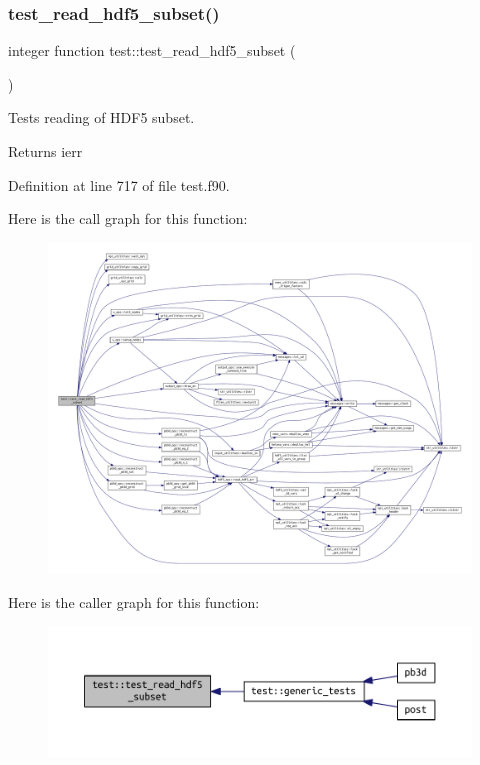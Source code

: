 \subsubsection{\texorpdfstring{test\+\_\+read\+\_\+hdf5\+\_\+subset()}{test\_read\_hdf5\_subset()}}
{\footnotesize\ttfamily integer function test\+::test\+\_\+read\+\_\+hdf5\+\_\+subset (\begin{DoxyParamCaption}{ }\end{DoxyParamCaption})}



Tests reading of H\+D\+F5 subset. 

\begin{DoxyReturn}{Returns}
ierr 
\end{DoxyReturn}


Definition at line 717 of file test.\+f90.

Here is the call graph for this function\+:
\nopagebreak
\begin{figure}[H]
\begin{center}
\leavevmode
\includegraphics[width=350pt]{namespacetest_ac574f08ba400cd61070a6a6f13f6f7ee_cgraph}
\end{center}
\end{figure}
Here is the caller graph for this function\+:\nopagebreak
\begin{figure}[H]
\begin{center}
\leavevmode
\includegraphics[width=350pt]{namespacetest_ac574f08ba400cd61070a6a6f13f6f7ee_icgraph}
\end{center}
\end{figure}
\mbox{\label{namespacetest_a53c6b3d654d4577af301fe3b04473d6a}} 
